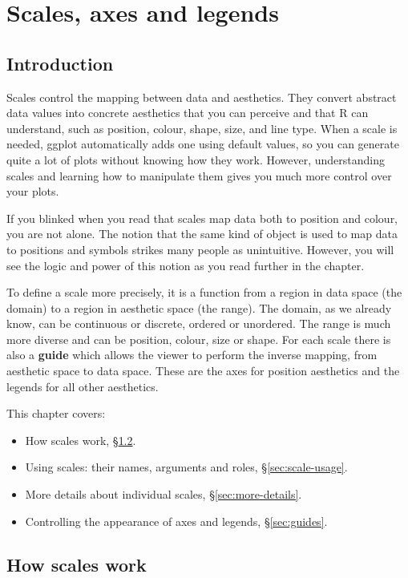 
\chapter{Scales, axes and legends}
\label{cha:scales}

\section{Introduction}

Scales control the mapping between data and aesthetics.  They convert abstract data values into concrete aesthetics that you can perceive and that R can understand, such as position, colour, shape, size, and line type.  When a scale is needed, ggplot automatically adds one using default values, so you can generate quite a lot of plots without knowing how they work.  However, understanding scales and learning how to manipulate them gives you much more control over your plots.

If you blinked when you read that scales map data both to position and colour, you are not alone.  The notion that the same kind of object is used to map data to positions and symbols strikes many people as unintuitive.  However, you will see the logic and power of this notion as you read further in the chapter.

To define a scale more precisely, it is a function from a region in data space (the domain) to a region in aesthetic space (the range). The domain, as we already know, can be continuous or discrete, ordered or unordered.  The range is much more diverse and can be position, colour, size or shape.  For each scale there is also a {\bf guide} which allows the viewer to perform the inverse mapping, from aesthetic space to data space.  These are the axes for position aesthetics and the legends for all other aesthetics.

This chapter covers:

\begin{itemize}
  \item How scales work, \S \ref{sec:how-scales-work}.
  \item Using scales: their names, arguments and roles, \S \ref{sec:scale-usage}.
  \item More details about individual scales, \S \ref{sec:more-details}.
  \item Controlling the appearance of axes and legends, \S \ref{sec:guides}.
\end{itemize}

\section{How scales work}
\label{sec:how-scales-work}


